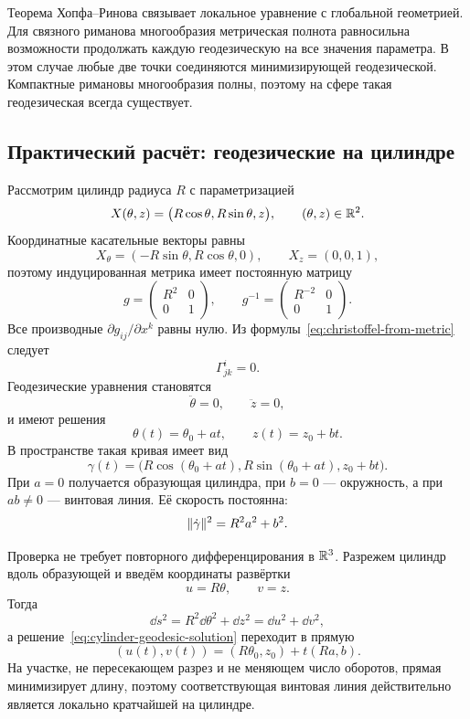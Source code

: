 Теорема Хопфа--Ринова связывает локальное уравнение с глобальной геометрией. Для связного риманова многообразия метрическая полнота равносильна возможности продолжать каждую геодезическую на все значения параметра. В этом случае любые две точки соединяются минимизирующей геодезической. Компактные римановы многообразия полны, поэтому на сфере такая геодезическая всегда существует.

\subsection{Практический расчёт: геодезические на цилиндре}

Рассмотрим цилиндр радиуса $R$ с параметризацией
\begin{equation}
\label{eq:cylinder-parameterization-v07}
X(\theta,z)
=
\bigl(R\cos\theta,R\sin\theta,z\bigr),
\qquad
(\theta,z)\in\mathbb{R}^2.
\end{equation}
Координатные касательные векторы равны
\[
X_\theta=(-R\sin\theta,R\cos\theta,0),
\qquad
X_z=(0,0,1),
\]
поэтому индуцированная метрика имеет постоянную матрицу
\begin{equation}
\label{eq:cylinder-metric-v07}
g=
\begin{pmatrix}
R^2&0\\
0&1
\end{pmatrix},
\qquad
g^{-1}=
\begin{pmatrix}
R^{-2}&0\\
0&1
\end{pmatrix}.
\end{equation}
Все производные $\partial g_{ij}/\partial x^k$ равны нулю. Из формулы~\eqref{eq:christoffel-from-metric} следует
\[
\Gamma^i_{jk}=0.
\]
Геодезические уравнения становятся
\[
\ddot\theta=0,
\qquad
\ddot z=0,
\]
и имеют решения
\begin{equation}
\label{eq:cylinder-geodesic-solution}
\theta(t)=\theta_0+at,
\qquad
z(t)=z_0+bt.
\end{equation}
В пространстве такая кривая имеет вид
\[
\gamma(t)
=
\bigl(R\cos(\theta_0+at),
R\sin(\theta_0+at),
z_0+bt\bigr).
\]
При $a=0$ получается образующая цилиндра, при $b=0$ --- окружность, а при $ab\neq0$ --- винтовая линия. Её скорость постоянна:
\[
\lVert\dot\gamma\rVert^2=R^2a^2+b^2.
\]

Проверка не требует повторного дифференцирования в $\mathbb{R}^3$. Разрежем цилиндр вдоль образующей и введём координаты развёртки
\[
u=R\theta,
\qquad
v=z.
\]
Тогда
\[
\dd s^2=R^2\dd\theta^2+\dd z^2=\dd u^2+\dd v^2,
\]
а решение~\eqref{eq:cylinder-geodesic-solution} переходит в прямую
\[
(u(t),v(t))=(R\theta_0,z_0)+t(Ra,b).
\]
На участке, не пересекающем разрез и не меняющем число оборотов, прямая минимизирует длину, поэтому соответствующая винтовая линия действительно является локально кратчайшей на цилиндре.


